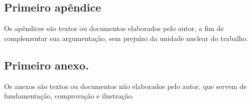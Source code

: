 \documentclass[
	12pt,			%
	openright,		%
	oneside,	
	a4paper,		%
	english,		%
	brazil			%
]{abntex2/abntex2}  %
\begin{document}
\postextual
{}



\begin{apendicesenv}

\chapter{Primeiro apêndice}

Os apêndices são textos ou documentos elaborados pelo autor, a fim de complementar sua argumentação, sem prejuízo da unidade nuclear do trabalho.

\end{apendicesenv}


\begin{anexosenv}

\chapter{Primeiro anexo.}

Os anexos são textos ou documentos não elaborados pelo autor, que servem de fundamentação, comprovação e ilustração.

\end{anexosenv}
\end{document}
